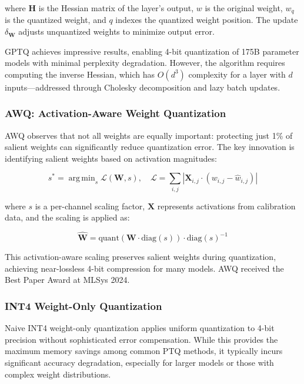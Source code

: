 \documentclass[11pt,a4paper]{article}
\DeclareMathOperator*{\argmin}{arg\,min}
\begin{document}
where $\mathbf{H}$ is the Hessian matrix of the layer's output, $w$ is the original weight, $w_q$ is the quantized weight, and $q$ indexes the quantized weight position. The update $\delta_{\mathbf{W}}$ adjusts unquantized weights to minimize output error.

GPTQ achieves impressive results, enabling 4-bit quantization of 175B parameter models with minimal perplexity degradation. However, the algorithm requires computing the inverse Hessian, which has $O(d^3)$ complexity for a layer with $d$ inputs—addressed through Cholesky decomposition and lazy batch updates.

\subsubsection{AWQ: Activation-Aware Weight Quantization}

AWQ \cite{lin2023awq} observes that not all weights are equally important: protecting just 1\% of salient weights can significantly reduce quantization error. The key innovation is identifying salient weights based on activation magnitudes:

\begin{equation}
s^* = \argmin_{s} \mathcal{L}(\mathbf{W}, s), \quad \mathcal{L} = \sum_{i,j} \left| \mathbf{X}_{i,j} \cdot (w_{i,j} - \hat{w}_{i,j}) \right|
\end{equation}

where $s$ is a per-channel scaling factor, $\mathbf{X}$ represents activations from calibration data, and the scaling is applied as:

\begin{equation}
\hat{\mathbf{W}} = \text{quant}(\mathbf{W} \cdot \text{diag}(s)) \cdot \text{diag}(s)^{-1}
\end{equation}

This activation-aware scaling preserves salient weights during quantization, achieving near-lossless 4-bit compression for many models. AWQ received the Best Paper Award at MLSys 2024.

\subsubsection{INT4 Weight-Only Quantization}

Naive INT4 weight-only quantization applies uniform quantization to 4-bit precision without sophisticated error compensation. While this provides the maximum memory savings among common PTQ methods, it typically incurs significant accuracy degradation, especially for larger models or those with complex weight distributions.
\end{document}
